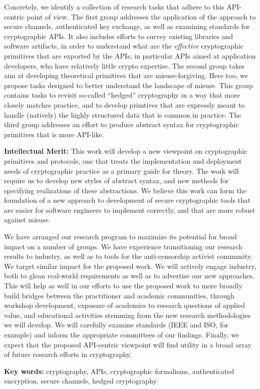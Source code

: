 \documentclass[10pt]{article}
\begin{document}
Concretely, we identify a collection of research tasks that adhere to
this API-centric point of view.  The first group addresses the
application of the approach to secure channels, authenticated key
exchange, as well as examining standards for cryptographic APIs.  It
also includes efforts to survey existing libraries and software
artifacts, in order to understand what are the \emph{effective}
cryptographic primitives that are exported by the APIs; in particular
APIs aimed at application developers, who have relatively little
crypto expertise.  
%
The second group takes aim at developing
theoretical primitives that are misuse-forgiving.  Here too, we
propose tasks designed to better understand the landscape of misuse.
This group contains tasks to revisit so-called ``hedged'' cryptography
in a way that more closely matches practice, and to develop primtives
that are expressly meant to handle (natively) the highly structured
data that is common in practice.
%
The third group addresses an effort to produce abstract syntax for
cryptographic primitives that is more API-like.
  

\smallskip
\noindent \textbf{Intellectual Merit:} This work will develop a new
viewpoint on cryptographic primitives and protocols, one that treats the
implementation and deployment needs of cryptographic practice as a
primary guide for theory.  The work will require us to develop new styles of
abstract syntax, and new methods for specifying realizations of these
abstractions.  
We believe this work can form the foundation of a new approach to
development of secure cryptographic tools that are easier for
software engineers to implement correctly, and that are more robust against
misuse.  

\smallskip

  We have arranged our research program to
maximize its potential for broad impact on a number of groups. We have
experience transitioning our research results to industry, as well as to tools for the anti-censorship
activist community. We target similar impact for the proposed
work. We will actively engage industry, both to glean real-world requirements
as well as to advertise our new approaches.  This will help as well in our efforts
to use the proposed work to more broadly build bridges between the practitioner
and academic communities, through workshop development, exposure of academics to 
research questions of applied value, and educational activities stemming from
the new research methodologies we will develop. We will carefully examine
standards (IEEE and ISO, for example) and inform the appropriate
committees of our
findings. Finally, we expect that the proposed API-centric viewpoint will find utility in a broad array
of future research efforts in cryptography.

\vspace{1ex}
\noindent 
{\bf Key words:} cryptography, APIs, cryptographic formalisms,
authenticated encryption, secure channels, hedged cryptography
\end{document}
